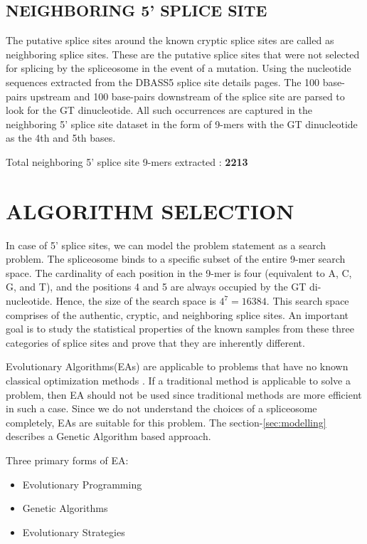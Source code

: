 \documentclass[12pt,a4paper]{article}
\begin{document}
	\subsection{NEIGHBORING 5' SPLICE SITE}
	The putative splice sites around the known cryptic splice sites are called as neighboring splice sites. These are the putative splice sites that were not selected for splicing by the spliceosome in the event of a mutation. Using the nucleotide sequences extracted from the DBASS5 splice site details pages. The 100 base-pairs upstream and 100 base-pairs downstream of the splice site are parsed to look for the GT dinucleotide. All such occurrences are captured in the neighboring 5’ splice site dataset in the form of 9-mers with the GT dinucleotide as the 4th and 5th bases.\par
	
	Total neighboring 5’ splice site 9-mers extracted : \textbf{2213}
	
	\section{ALGORITHM SELECTION}
	In case of 5’ splice sites, we can model the problem statement as a search problem. The spliceosome binds to a specific subset of the entire 9-mer search space. The cardinality of each position in the 9-mer is four (equivalent to A, C, G, and T), and the positions 4 and 5 are always occupied by the GT di-nucleotide. Hence, the size of the search space is $ 4^{7} = 16384 $. This search space comprises of the authentic, cryptic, and neighboring splice sites. An important goal is to study the statistical properties of the known samples from these three categories of splice sites and prove that they are inherently different. \par
	Evolutionary Algorithms(EAs) are applicable to problems that have no known classical optimization methods \cite{handbook}. If a traditional method is applicable to solve a problem, then EA should not be used since traditional methods are more efficient in such a case. Since we do not understand the choices of a spliceosome completely, EAs are suitable for this problem. The section-\ref{sec:modelling} describes a Genetic Algorithm based approach.\par
	Three primary forms of EA:
	\begin{itemize}
	\item Evolutionary Programming
	\item Genetic Algorithms
	\item Evolutionary Strategies
	\end{itemize}
	
\end{document}

